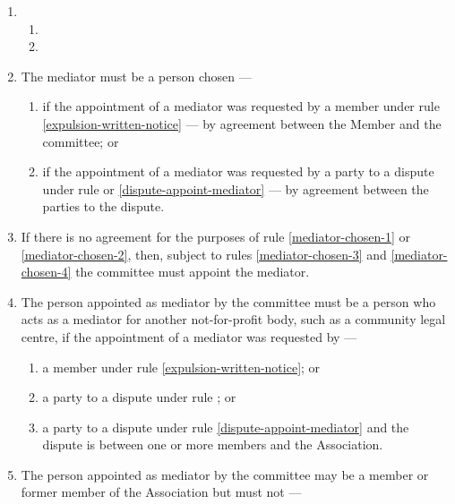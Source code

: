\documentclass[../constitution.tex]{subfiles}
\begin{document}
\begin{enumerate}

\item {}

  \begin{enumerate}
  
  \item {}
  \item {}
  \end{enumerate}
\item The mediator must be a person chosen ---

  \begin{enumerate}
  
  \item if the appointment of a mediator was requested by a member under rule \ref{expulsion-written-notice} --- by agreement between the Member and the committee; or \label{mediator-chosen-1}
  \item if the appointment of a mediator was requested by a party to a dispute under rule  or \ref{dispute-appoint-mediator} --- by agreement between the parties to the dispute. \label{mediator-chosen-2}
  \end{enumerate}
\item If there is no agreement for the purposes of rule \ref{mediator-chosen-1} or \ref{mediator-chosen-2}, then, subject to rules \ref{mediator-chosen-3} and \ref{mediator-chosen-4} the committee must appoint the mediator.
\item The person appointed as mediator by the committee must be a person who acts as a mediator for another not-for-profit body, such as a community legal centre, if the appointment of a mediator was requested by --- \label{mediator-chosen-3}

  \begin{enumerate}
  
  \item a member under rule \ref{expulsion-written-notice}; or
  \item a party to a dispute under rule ; or
  \item a party to a dispute under rule \ref{dispute-appoint-mediator} and the dispute is between one or more members and the Association.
  \end{enumerate}
\item The person appointed as mediator by the committee may be a member or former member of the Association but must not --- \label{mediator-chosen-4}


\end{enumerate}
\end{document}
